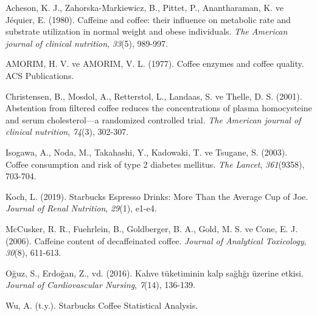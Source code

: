 \documentclass[
  12pt,
]{article}
\newlength{\cslhangindent}
\newlength{\cslentryspacingunit} %
\newenvironment{CSLReferences}[2] %
 {%
  \setlength{\parindent}{0pt}
  \ifodd #1
  \let\oldpar\par
  \def\par{\hangindent=\cslhangindent\oldpar}
  \fi
  \setlength{\parskip}{#2\cslentryspacingunit}
 }%
 {}
\begin{document}
\hypertarget{refs}{}
\begin{CSLReferences}{1}{0}
\leavevmode{}%
Acheson, K. J., Zahorska-Markiewicz, B., Pittet, P., Anantharaman, K. ve Jéquier, E. (1980). Caffeine and coffee: their influence on metabolic rate and substrate utilization in normal weight and obese individuals. \emph{The American journal of clinical nutrition}, \emph{33}(5), 989-997.

\leavevmode{}%
AMORIM, H. V. ve AMORIM, V. L. (1977). Coffee enzymes and coffee quality. ACS Publications.

\leavevmode{}%
Christensen, B., Mosdol, A., Retterstol, L., Landaas, S. ve Thelle, D. S. (2001). Abstention from filtered coffee reduces the concentrations of plasma homocysteine and serum cholesterol---a randomized controlled trial. \emph{The American journal of clinical nutrition}, \emph{74}(3), 302-307.

\leavevmode{}%
Isogawa, A., Noda, M., Takahashi, Y., Kadowaki, T. ve Tsugane, S. (2003). Coffee consumption and risk of type 2 diabetes mellitus. \emph{The Lancet}, \emph{361}(9358), 703-704.

\leavevmode{}%
Koch, L. (2019). Starbucks Espresso Drinks: More Than the Average Cup of Joe. \emph{Journal of Renal Nutrition}, \emph{29}(1), e1-e4.

\leavevmode{}%
McCusker, R. R., Fuehrlein, B., Goldberger, B. A., Gold, M. S. ve Cone, E. J. (2006). Caffeine content of decaffeinated coffee. \emph{Journal of Analytical Toxicology}, \emph{30}(8), 611-613.

\leavevmode{}%
Oğuz, S., Erdoğan, Z., vd. (2016). Kahve t{ü}ketiminin kalp sa{ğ}l{ı}{ğ}{ı} {ü}zerine etkisi. \emph{Journal of Cardiovascular Nursing}, \emph{7}(14), 136-139.

\leavevmode{}%
Wu, A. (t.y.). Starbucks Coffee Statistical Analysis.

\end{CSLReferences}
\end{document}
